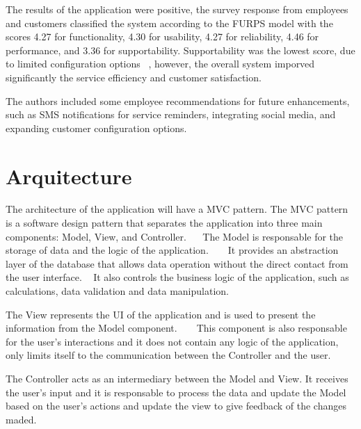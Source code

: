The results of the application were positive, the survey response from employees and customers classified the system according to the \ac{FURPS} model with the scores 4.27 for functionality, 4.30 for usability, 4.27 for reliability, 4.46 for performance, and 3.36 for supportability.
Supportability was the lowest score, due to limited configuration options ~\cite{MARS_MOTORS}, however, the overall system imporved significantly the service efficiency and customer satisfaction. ~\cite{MARS_MOTORS}

The authors included some employee recommendations for future enhancements, such as SMS notifications for service reminders, integrating social media, and expanding customer configuration options.


\section{Arquitecture}

The architecture of the application will have a \ac{MVC} pattern. 
The \ac{MVC} pattern is a software design pattern that separates the application into three main components: Model, View, and Controller.~\cite{mvc_geeksforgeeks} ~\cite{MVC_StartupHouse}
The Model is responsable for the storage of data and the logic of the application.  ~\cite{mvc_geeksforgeeks} ~\cite{MVC_StartupHouse}
It provides an abstraction layer of the database that allows data operation without the direct contact from the user interface. ~\cite{MVC_StartupHouse}
It also controls the business logic of the application, such as calculations, data validation and data manipulation. ~\cite{MVC_StartupHouse}

The View represents the \ac{UI} of the application and is used to present the information from the Model component. ~\cite{mvc_geeksforgeeks} ~\cite{MVC_StartupHouse}
This component is also responsable for the user's interactions and it does not contain any logic of the application, only limits itself to the communication between the Controller and the user. ~\cite{MVC_StartupHouse}

The Controller acts as an intermediary between the Model and View.
It receives the user's input and it is responsable to process the data and update the Model based on the user's actions and update the view to give feedback of the changes maded. ~\cite{mvc_geeksforgeeks} ~\cite{MVC_StartupHouse}


